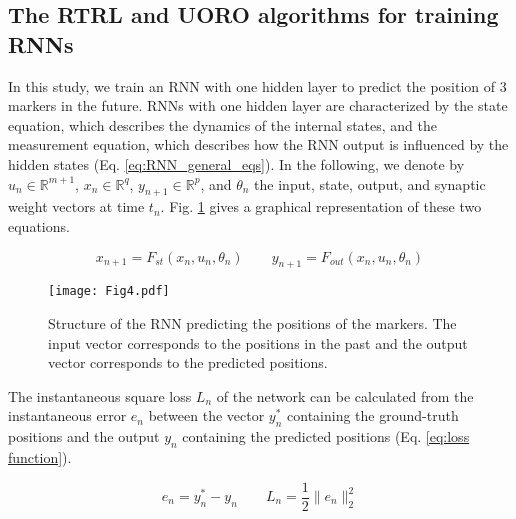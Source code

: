 \documentclass[twocolumn,a4paper]{svjour3} \sloppy          \smartqed
\begin{document}
\subsection{The RTRL and UORO algorithms for training RNNs}

In this study, we train an RNN with one hidden layer to predict the position of 3 markers in the future. RNNs with one hidden layer are characterized by the state equation, which describes the dynamics of the internal states, and the measurement equation, which describes how the RNN output is influenced by the hidden states (Eq. \ref{eq:RNN_general_eqs}). In the following, we denote by $u_n \in \mathbb{R}^{m+1}$, $x_n \in \mathbb{R}^q$, $y_{n+1} \in \mathbb{R}^p$, and $\theta_n$ the input, state, output, and synaptic weight vectors at time $t_n$. Fig. \ref{fig:rnn_structure} gives a graphical representation of these two equations.

\begin{equation} \label{eq:RNN_general_eqs}
x_{n+1} = F_{st}(x_n, u_n, \theta_n)
\qquad
y_{n+1} = F_{out}(x_n, u_n, \theta_n)
\end{equation}

\begin{figure} [htb!]
	\centering
\texttt{[image: Fig4.pdf]}
	\caption{Structure of the RNN predicting the positions of the markers. The input vector   corresponds to the positions in the past and the output vector  corresponds to the predicted positions\protect\footnotemark  .}
	\label{fig:rnn_structure}
\end{figure}


The instantaneous square loss $L_n$ of the network can be calculated from the instantaneous error $e_n$ between the vector $y_n^{*}$ containing the ground-truth positions and the output $y_n$ containing the predicted positions (Eq. \ref{eq:loss function}).    

\begin{equation} \label{eq:loss function}
 e_{n} = y_n^* - y_n
\qquad
 L_{n} = \frac{1}{2} \|e_n\|_2^2
\end{equation}
\end{document}
